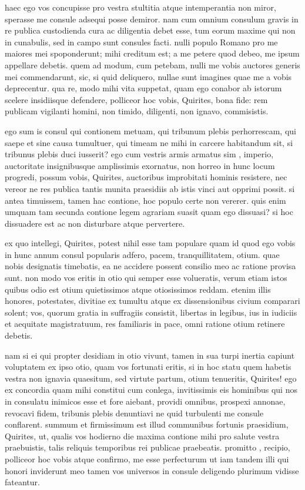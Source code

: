  haec ego vos concupisse pro vestra stultitia atque intemperantia non miror, sperasse me consule adsequi posse demiror. nam cum omnium consulum gravis in re publica custodienda cura ac diligentia debet esse, tum eorum maxime qui non in cunabulis, sed in campo sunt consules facti. nulli populo Romano pro me maiores mei spoponderunt; mihi creditum est; a me petere quod debeo, me ipsum appellare debetis. quem ad modum, cum petebam, nulli me vobis auctores generis mei commendarunt, sic, si quid deliquero, nullae sunt imagines quae me a vobis deprecentur. qua re, modo mihi vita suppetat, quam ego conabor ab istorum scelere insidiisque defendere, polliceor hoc vobis, Quirites, bona fide: rem publicam vigilanti homini, non timido, diligenti, non ignavo, commisistis.

 ego sum is consul qui contionem metuam, qui tribunum plebis perhorrescam, qui saepe et sine causa tumultuer, qui timeam ne mihi in carcere habitandum sit, si tribunus plebis duci iusserit? ego cum vestris armis armatus sim , imperio, auctoritate insignibusque amplissimis exornatus, non horreo in hunc locum progredi, possum vobis, Quirites, auctoribus improbitati hominis resistere, nec vereor ne res publica tantis munita praesidiis ab istis vinci aut opprimi possit. si antea timuissem, tamen hac contione, hoc populo certe non vererer. quis enim umquam tam secunda contione legem agrariam suasit quam ego dissuasi? si hoc dissuadere est ac non disturbare atque pervertere.

 ex quo intellegi, Quirites, potest nihil esse tam populare quam id quod ego vobis in hunc annum consul popularis adfero, pacem, tranquillitatem, otium. quae nobis designatis timebatis, ea ne accidere possent consilio meo ac ratione provisa sunt. non modo vos eritis in otio qui semper esse volueratis, verum etiam istos quibus odio est otium quietissimos atque otiosissimos reddam. etenim illis honores, potestates, divitiae ex tumultu atque ex dissensionibus civium comparari solent; vos, quorum gratia in suffragiis consistit, libertas in legibus, ius in iudiciis et aequitate magistratuum, res familiaris in pace, omni ratione otium retinere debetis.

 nam si ei qui propter desidiam in otio vivunt, tamen in sua turpi inertia capiunt voluptatem ex ipso otio, quam vos fortunati eritis, si in hoc statu quem habetis vestra non ignavia quaesitum, sed virtute partum, otium tenueritis, Quirites! ego ex concordia quam mihi constitui cum conlega, invitissimis eis hominibus qui nos in consulatu inimicos esse et fore aiebant, providi omnibus, prospexi annonae, revocavi fidem, tribunis plebis denuntiavi ne quid turbulenti me consule conflarent. summum et firmissimum est illud communibus fortunis praesidium, Quirites, ut, qualis vos hodierno die maxima contione mihi pro salute vestra praebuistis, talis reliquis temporibus rei publicae praebeatis. promitto , recipio, polliceor hoc vobis atque confirmo, me esse perfecturum ut iam tandem illi qui honori inviderunt meo tamen vos universos in consule deligendo plurimum vidisse fateantur.
